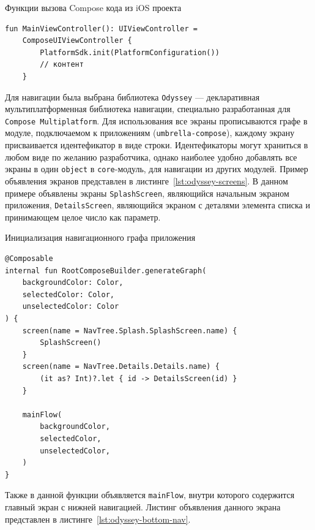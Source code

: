 \documentclass[14pt, russian]{scrartcl}
\begin{document}
\begin{listing}[!htb]
\caption{Функции вызова Compose кода из iOS проекта}
\label{lst:compose-ios-viewcontroller}
\begin{verbatim}
fun MainViewController(): UIViewController =
    ComposeUIViewController {
        PlatformSdk.init(PlatformConfiguration())
        // контент
    }
\end{verbatim}
\end{listing}

Для навигации была выбрана библиотека \texttt{Odyssey} --- декларативная мультиплатформенная библиотека навигации, специально разработанная для \texttt{Compose Multiplatform}. Для использования все экраны прописываются графе в модуле, подключаемом к приложениям (\texttt{umbrella-compose}), каждому экрану присваивается идентефикатор в виде строки. Идентефикаторы могут храниться в любом виде по желанию разработчика, однако наиболее удобно добавлять все экраны в один \texttt{object} в \texttt{core}-модуль, для навигации из других модулей. Пример объявления экранов представлен в листинге~\ref{lst:odyssey-screens}. В данном примере объявлены экраны \texttt{SplashScreen}, являющийся начальным экраном приложения, \texttt{DetailsScreen}, являющийся экраном с деталями элемента списка и принимающем целое число как параметр.

\begin{listing}[!htb]
\caption{Инициализация навигационного графа приложения}
\label{lst:odyssey-screens}
\begin{verbatim}
@Composable
internal fun RootComposeBuilder.generateGraph(
    backgroundColor: Color,
    selectedColor: Color,
    unselectedColor: Color
) {
    screen(name = NavTree.Splash.SplashScreen.name) {
        SplashScreen()
    }
    screen(name = NavTree.Details.Details.name) {
        (it as? Int)?.let { id -> DetailsScreen(id) }
    }

    mainFlow(
        backgroundColor,
        selectedColor,
        unselectedColor,
    )
}
\end{verbatim}
\end{listing}

Также в данной функции объявляется \texttt{mainFlow}, внутри которого содержится главный экран с нижней навигацией. Листинг объявления данного экрана представлен в листинге~\ref{lst:odyssey-bottom-nav}.
\end{document}
